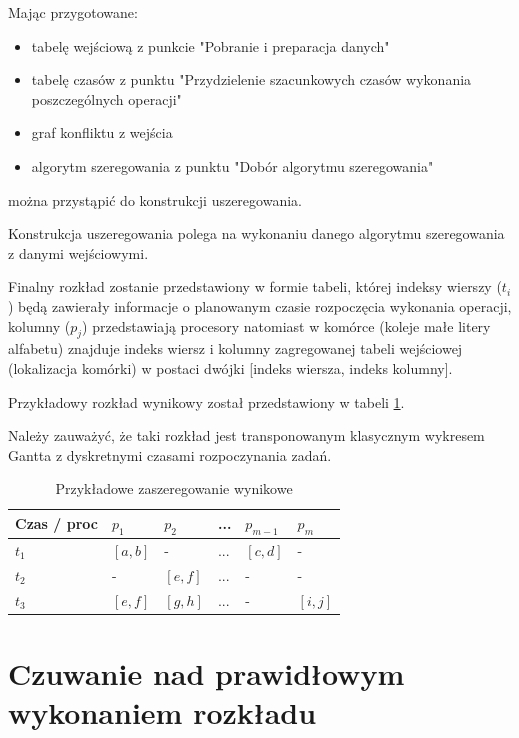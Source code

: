 \documentclass[brudnopis]{xmgr}
\begin{document}
Mając przygotowane:

\begin{itemize}
    \item tabelę wejściową z punkcie "Pobranie i preparacja danych"
    \item tabelę czasów z punktu "Przydzielenie szacunkowych czasów wykonania poszczególnych operacji"
    \item graf konfliktu z wejścia
    \item algorytm szeregowania z punktu "Dobór algorytmu szeregowania"
\end{itemize}

można przystąpić do konstrukcji uszeregowania.

Konstrukcja uszeregowania polega na wykonaniu danego algorytmu szeregowania z danymi wejściowymi.

Finalny rozkład zostanie przedstawiony w formie tabeli, której indeksy wierszy ($t_i$) będą zawierały informacje o planowanym czasie rozpoczęcia wykonania operacji, kolumny ($p_j$) przedstawiają procesory natomiast w komórce (koleje małe litery alfabetu) znajduje indeks wiersz i kolumny zagregowanej tabeli wejściowej (lokalizacja komórki) w postaci dwójki [indeks wiersza, indeks kolumny].

Przykładowy rozkład wynikowy został przedstawiony w tabeli \ref{tab:example-sched-out}.

Należy zauważyć, że taki rozkład jest transponowanym klasycznym wykresem Gantta z dyskretnymi czasami rozpoczynania zadań.

\begin{table}[!tbh]
\begin{tabular}{|l|l|l|l|l|l|} \hline
Czas / proc & $p_1$     & $p_2$     & ...   & $p_{m-1}$ & $p_{m}$ \\ \hline
$t_1$       & $[a,b]$   & -         & ...   & $[c,d]$   & - \\ \hline
$t_2$       & -         & $[e,f]$   & ...   & -         & - \\ \hline
$t_3$       & $[e,f]$   & $[g,h]$   & ...   & -         & $[i,j]$\\ \hline
\end{tabular}
\caption{Przykładowe zaszeregowanie wynikowe\label{tab:example-sched-out}}
\end{table}

\section{Czuwanie nad prawidłowym wykonaniem rozkładu}
\end{document}
